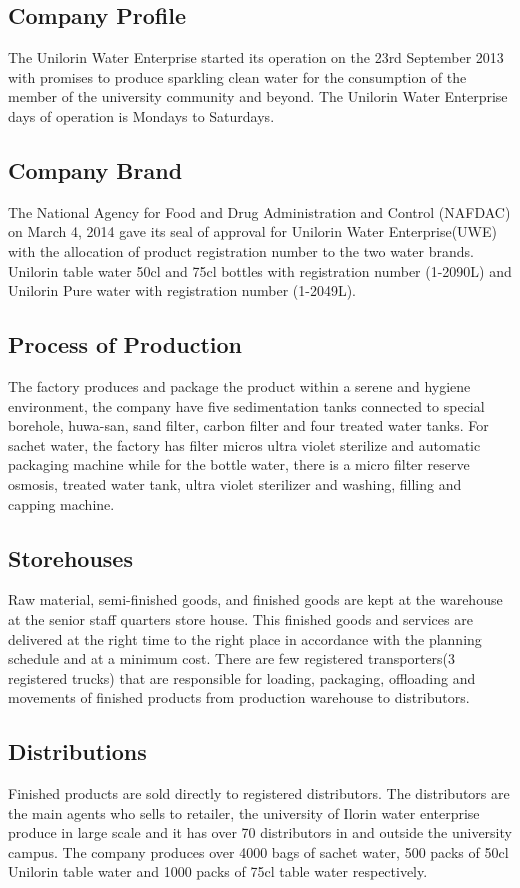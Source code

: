 \documentclass[12pt]{report}
\newcommand{\uwe}{Unilorin Water Enterprise }
\newcommand{\uwee}{Unilorin Water Enterprise(UWE) }
\begin{document}
	\subsection{Company Profile}
	The \uwe started its operation on the 23rd September 2013 with promises to produce sparkling clean water for the consumption of the member of the university community and beyond. The \uwe days of operation is Mondays to Saturdays.
	
	\subsection{Company Brand}
	The National Agency for Food and Drug Administration and Control (NAFDAC) on March 4, 2014 gave its seal of approval for \uwee with the allocation of product registration number to the two water brands. Unilorin table water 50cl and 75cl bottles with registration number (1-2090L) and Unilorin Pure water with registration number (1-2049L).
	
	\subsection{Process of Production}
	The factory produces and package the product within a serene and hygiene environment, the company have five sedimentation tanks connected to special borehole, huwa-san, sand filter, carbon filter and four treated water tanks. For sachet water, the factory has filter micros ultra violet sterilize and automatic packaging machine while for the bottle water, there is a micro filter reserve osmosis, treated water tank, ultra violet sterilizer and washing, filling and capping machine.
	
	\subsection{Storehouses}
	Raw material, semi-finished goods, and finished goods are kept at the warehouse at the senior staff quarters store house. This finished goods and services are delivered at the right time to the right place in accordance with the planning schedule and at a minimum cost. There are few registered transporters(3 registered trucks) that are responsible for loading, packaging, offloading and movements of finished products from production warehouse to distributors.
	
	\subsection{Distributions}
	Finished products are sold directly to registered distributors. The distributors are the main agents who sells to retailer, the university of Ilorin water enterprise produce in large scale and it has over 70 distributors in and outside the university campus. The company produces over 4000 bags of sachet water, 500 packs of 50cl Unilorin table water and 1000 packs of 75cl table water respectively.
\end{document}
